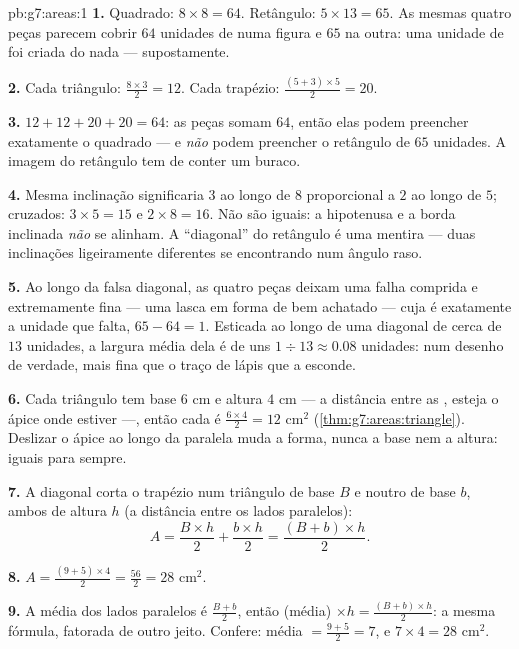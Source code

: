 \begin{solution}{pb:g7:areas:1}
\textbf{1.} Quadrado: $8 \times 8 = 64$. Retângulo:
$5 \times 13 = 65$. As mesmas quatro peças parecem cobrir $64$
unidades de  numa figura e $65$ na outra: uma unidade de  foi
criada do nada --- supostamente.

\textbf{2.} Cada triângulo: $\frac{8 \times 3}{2} = 12$. Cada
trapézio: $\frac{(5 + 3) \times 5}{2} = 20$.

\textbf{3.} $12 + 12 + 20 + 20 = 64$: as peças somam $64$, então elas
podem preencher exatamente o quadrado --- e \emph{não} podem preencher
o retângulo de $65$ unidades. A imagem do retângulo tem de conter um
buraco.

\textbf{4.} Mesma inclinação significaria $3$ ao longo de $8$
proporcional a $2$ ao longo de $5$;  cruzados:
$3 \times 5 = 15$ e $2 \times 8 = 16$. Não são iguais: a hipotenusa e a
borda inclinada \emph{não} se alinham. A ``diagonal'' do retângulo é
uma mentira --- duas inclinações ligeiramente diferentes se encontrando
num ângulo raso.

\textbf{5.} Ao longo da falsa diagonal, as quatro peças deixam uma
falha comprida e extremamente fina --- uma lasca em forma de
 bem achatado --- cuja  é exatamente a unidade que
falta, $65 - 64 = 1$. Esticada ao longo de uma diagonal de cerca de
$13$ unidades, a largura média dela é de uns
$1 \div 13 \approx 0.08$ unidades: num desenho de verdade, mais fina
que o traço de lápis que a esconde.

\textbf{6.} Cada triângulo tem base $6$ cm e altura $4$ cm --- a
distância entre as , esteja o ápice onde estiver ---, então
cada  é $\frac{6 \times 4}{2} = 12$ cm$^2$
(\cref{thm:g7:areas:triangle}). Deslizar o ápice ao longo da paralela
muda a forma, nunca a base nem a altura:  iguais para sempre.

\textbf{7.} A diagonal corta o trapézio num triângulo de base $B$ e
noutro de base $b$, ambos de altura $h$ (a distância entre os lados
paralelos):
\[
A = \frac{B \times h}{2} + \frac{b \times h}{2}
= \frac{(B + b) \times h}{2} .
\]

\textbf{8.} $A = \frac{(9 + 5) \times 4}{2} = \frac{56}{2} = 28$
cm$^2$.

\textbf{9.} A média dos lados paralelos é $\frac{B + b}{2}$, então
(média) $\times h = \frac{(B+b) \times h}{2}$: a mesma fórmula,
fatorada de outro jeito. Confere: média $= \frac{9+5}{2} = 7$, e
$7 \times 4 = 28$ cm$^2$.


\end{solution}
